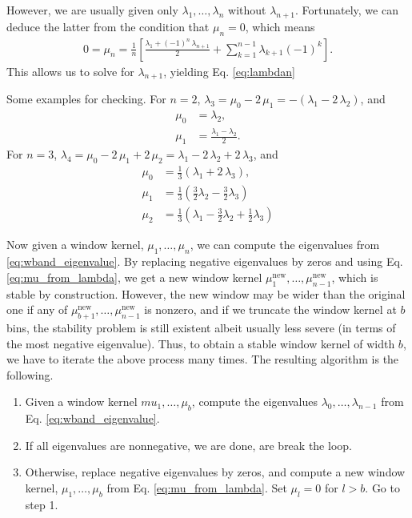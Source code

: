 \documentclass[reprint, floatfix]{revtex4-1}
\begin{document}
{  However, we are usually given only $\lambda_1, \dots, \lambda_n$
  without $\lambda_{n + 1}$.
  Fortunately, we can deduce the latter from
  the condition that $\mu_n = 0$, which means
  $$
  \begin{aligned}
    0 = \mu_n
    =
    \frac{1}{n}
    \left[
      \frac{ \lambda_1 + (-1)^n \, \lambda_{n+1} }
           {               2                     }
      +
      \sum_{ k = 1 }^{ n - 1 }
      \lambda_{k+1} (-1)^k
    \right].
  \end{aligned}
  $$
  This allows us to solve for $\lambda_{ n + 1 }$,
  yielding Eq. \eqref{eq:lambdan}


  Some examples for checking.
  For $n = 2$,
  $\lambda_3
  = \mu_0 - 2 \, \mu_1
  = -(\lambda_1 - 2 \, \lambda_2)$,
  and
  $$
  \begin{aligned}
  \mu_0
  &=
  \lambda_2,
  \\
  \mu_1
  &=
  \frac{ \lambda_1 - \lambda_2 }
       {           2           }.
  \end{aligned}
  $$
  For $n = 3$,
  $\lambda_4
  = \mu_0 - 2 \, \mu_1 + 2 \, \mu_2
  = \lambda_1 - 2 \, \lambda_2 + 2 \, \lambda_3$,
  and
  $$
  \begin{aligned}
  \mu_0
  &=
  \frac{ 1 } { 3 }
  \left(
    \lambda_1 + 2 \, \lambda_3
  \right),
  \\
  \mu_1
  &=
  \frac{ 1 } { 3 }
  \left(
    \frac 3 2 \lambda_2
    -
    \frac 3 2 \lambda_3
  \right)
  \\
  \mu_2
  &=
  \frac{ 1 } { 3 }
  \left(
    \lambda_1
    -
    \frac 3 2 \lambda_2
    +
    \frac 1 2 \lambda_3
  \right)
  \end{aligned}
  $$
}

Now given a window kernel, $\mu_1, \dots, \mu_n$,
we can compute the eigenvalues from \eqref{eq:wband_eigenvalue}.
%
By replacing negative eigenvalues by zeros and
using Eq. \eqref{eq:mu_from_lambda},
we get a new window kernel
$\mu^\mathrm{new}_1, \dots, \mu^\mathrm{new}_{n - 1}$,
which is stable by construction.
%
However, the new window may be wider than
the original one if any of
$\mu^\mathrm{new}_{b+1}, \dots, \mu^\mathrm{new}_{n-1}$
is nonzero,
and if we truncate the window kernel at $b$ bins,
the stability problem is still existent
albeit usually less severe
(in terms of the most negative eigenvalue).
%
Thus, to obtain a stable window kernel of width $b$,
we have to iterate the above process many times.
The resulting algorithm is the following.


%
\begin{enumerate}
  \item
    Given a window kernel $mu_1, \dots, \mu_b$,
    compute the eigenvalues
    $\lambda_0, \dots, \lambda_{n-1}$
	from Eq. \eqref{eq:wband_eigenvalue}.
  \item
    If all eigenvalues are nonnegative,
    we are done, are break the loop.
  \item
    Otherwise, replace negative eigenvalues by zeros,
    and compute a new window kernel,
    $\mu_1, \dots, \mu_b$ from
    Eq. \eqref{eq:mu_from_lambda}.
    Set $\mu_l = 0$ for $l > b$.
    Go to step 1.
\end{enumerate}
\end{document}
